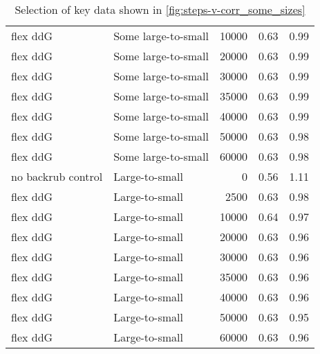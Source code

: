 \begin{table}
\begin{tabular}{llrrr}
           flex ddG &         Some large-to-small &         10000 & 0.63 & 0.99 \\
           flex ddG &         Some large-to-small &         20000 & 0.63 & 0.99 \\
           flex ddG &         Some large-to-small &         30000 & 0.63 & 0.99 \\
           flex ddG &         Some large-to-small &         35000 & 0.63 & 0.99 \\
           flex ddG &         Some large-to-small &         40000 & 0.63 & 0.99 \\
           flex ddG &         Some large-to-small &         50000 & 0.63 & 0.98 \\
           flex ddG &         Some large-to-small &         60000 & 0.63 & 0.98 \\
 no backrub control &              Large-to-small &             0 & 0.56 & 1.11 \\
           flex ddG &              Large-to-small &          2500 & 0.63 & 0.98 \\
           flex ddG &              Large-to-small &         10000 & 0.64 & 0.97 \\
           flex ddG &              Large-to-small &         20000 & 0.63 & 0.96 \\
           flex ddG &              Large-to-small &         30000 & 0.63 & 0.96 \\
           flex ddG &              Large-to-small &         35000 & 0.63 & 0.96 \\
           flex ddG &              Large-to-small &         40000 & 0.63 & 0.96 \\
           flex ddG &              Large-to-small &         50000 & 0.63 & 0.95 \\
           flex ddG &              Large-to-small &         60000 & 0.63 & 0.96 \\
\bottomrule
\end{tabular}

\caption[]{Selection of key data shown in \cref{fig:steps-v-corr_some_sizes}}
\label{tab:steps-v-corr_some_sizes-underlying-data}
\end{table}
